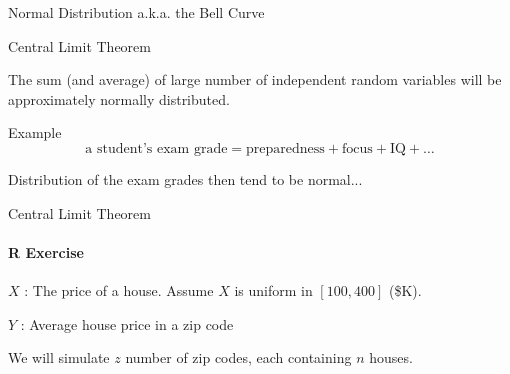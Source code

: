 \documentclass{beamer}\usepackage[]{graphicx}\usepackage[]{color}
\begin{document}
\begin{darkframes}
\begin{frame}[label=lists]{Normal Distribution a.k.a. the Bell Curve}
		
   			
	\end{frame}
	
	
	
	
	
	\begin{frame}[label=lists]{Central Limit Theorem}
		\begin{definition}
			The sum (and average) of large number of independent random variables will be approximately normally distributed.
		\end{definition}		 \pause
		
		\begin{exampleblock}{Example}
			$$
				\text{a student's exam grade} = \text{preparedness} + \text{focus} + \text{IQ} + \ldots 
			$$
		\end{exampleblock} \pause
		
		Distribution of the exam grades then tend to be normal...

   			
	\end{frame}	
	
	
	
	
	
	
	
	
	\begin{frame}[label=lists]{Central Limit Theorem}
		\framesubtitle{R Exercise} 
		 $X$ : The price of a house. Assume $X$ is uniform in $[100,400]$ (\$K).  \pause
		 
		 $Y$ : Average house price in a zip code  \pause
		 
		 We will simulate $z$ number of zip codes, each containing $n$ houses.	\pause 	
		
		
		\housePrices
   			
	\end{frame}	










\end{darkframes}
  
  
  
\end{document}
